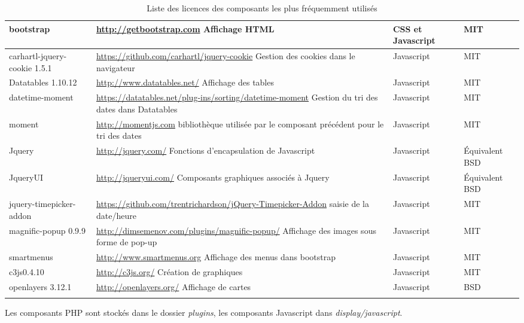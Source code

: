 \begin{longtable}{|>{\raggedright\arraybackslash}p{2cm}|p{7cm}|>{\raggedright\arraybackslash}p{1.5cm}|>{\raggedright\arraybackslash}p{1.5cm}|}
bootstrap & \url{http://getbootstrap.com} Affichage HTML & CSS et Javascript &  MIT\\
\hline
carhartl-jquery-cookie 1.5.1 & \url{https://github.com/carhartl/jquery-cookie} Gestion des cookies dans le navigateur & Javascript & MIT \\
\hline
Datatables 1.10.12 & \url{http://www.datatables.net/} Affichage des tables & Javascript & MIT \\
\hline
datetime-moment & \url{https://datatables.net/plug-ins/sorting/datetime-moment} Gestion du tri des dates dans Datatables & Javascript & MIT\\
\hline
moment & \url{http://momentjs.com} bibliothèque utilisée par le composant précédent pour le tri des dates & Javascript & MIT\\
\hline
Jquery & \url{http://jquery.com/} Fonctions d'encapsulation de Javascript & Javascript & Équivalent BSD \\
\hline
JqueryUI & \url{http://jqueryui.com/} Composants graphiques associés à Jquery & Javascript & Équivalent BSD \\
\hline
jquery-timepicker-addon & \url{https://github.com/trentrichardson/jQuery-Timepicker-Addon} saisie de la date/heure & Javascript & MIT\\
\hline
magnific-popup 0.9.9 & \url{http://dimsemenov.com/plugins/magnific-popup/} Affichage des images sous forme de pop-up & Javascript & MIT \\
\hline
smartmenus & \url{http://www.smartmenus.org} Affichage des menus dans bootstrap & Javascript & MIT\\
\hline
c3js0.4.10 & \url{http://c3js.org/} Création de graphiques & Javascript & MIT \\
\hline
openlayers 3.12.1 & \url{http://openlayers.org/} Affichage de cartes & Javascript & BSD\\
\hline

\caption{Liste des licences des composants les plus fréquemment utilisés}
\end{longtable}

Les composants PHP sont stockés dans le dossier \textit{plugins}, les composants Javascript dans \textit{display/javascript}.
